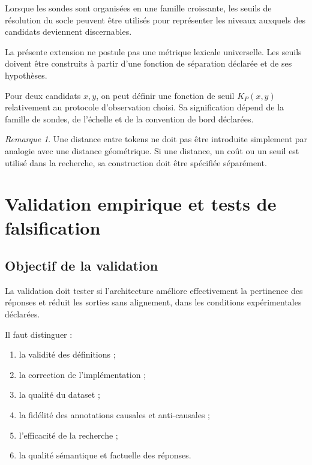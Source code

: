 \documentclass[11pt,a4paper,oneside]{book}
\theoremstyle{remark}
\newtheorem{remarque}[definition]{Remarque}
\begin{document}
Lorsque les sondes sont organisées en une famille croissante,
les seuils de résolution du socle peuvent être utilisés pour
représenter les niveaux auxquels des candidats deviennent
discernables.

La présente extension ne postule pas une métrique lexicale
universelle. Les seuils doivent être construits à partir d'une
fonction de séparation déclarée et de ses hypothèses.

Pour deux candidats \(x,y\), on peut définir une fonction de seuil
\(K_P(x,y)\) relativement au protocole d'observation choisi. Sa
signification dépend de la famille de sondes, de l'échelle et de
la convention de bord déclarées.

\begin{remarque}
Une distance entre tokens ne doit pas être introduite simplement
par analogie avec une distance géométrique. Si une distance,
un coût ou un seuil est utilisé dans la recherche, sa construction
doit être spécifiée séparément.
\end{remarque}


\chapter{Validation empirique et tests de falsification}

\section{Objectif de la validation}

La validation doit tester si l'architecture améliore effectivement
la pertinence des réponses et réduit les sorties sans alignement,
dans les conditions expérimentales déclarées.

Il faut distinguer :

\begin{enumerate}
  \item la validité des définitions ;
  \item la correction de l'implémentation ;
  \item la qualité du dataset ;
  \item la fidélité des annotations causales et anti-causales ;
  \item l'efficacité de la recherche ;
  \item la qualité sémantique et factuelle des réponses.
\end{enumerate}
\end{document}
